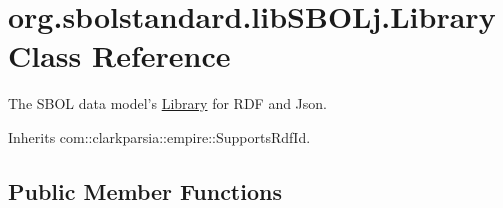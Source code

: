 \hypertarget{classorg_1_1sbolstandard_1_1lib_s_b_o_lj_1_1_library}{
\section{org.sbolstandard.libSBOLj.Library Class Reference}
\label{classorg_1_1sbolstandard_1_1lib_s_b_o_lj_1_1_library}
}


The SBOL data model's \hyperlink{classorg_1_1sbolstandard_1_1lib_s_b_o_lj_1_1_library}{Library} for RDF and Json.  




Inherits com::clarkparsia::empire::SupportsRdfId.

\subsection*{Public Member Functions}
